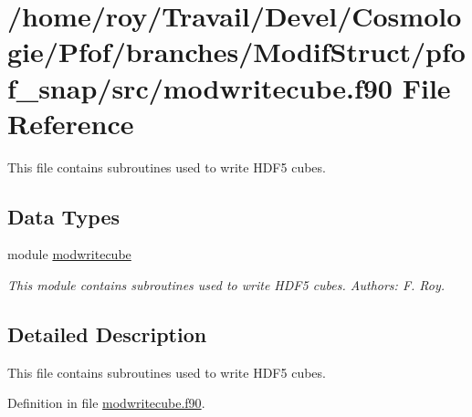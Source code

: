 \hypertarget{modwritecube_8f90}{\section{/home/roy/\-Travail/\-Devel/\-Cosmologie/\-Pfof/branches/\-Modif\-Struct/pfof\-\_\-snap/src/modwritecube.f90 File Reference}
\label{modwritecube_8f90}
}


This file contains subroutines used to write H\-D\-F5 cubes.  


\subsection*{Data Types}
\begin{DoxyCompactItemize}
\item 
module \hyperlink{classmodwritecube}{modwritecube}
\begin{DoxyCompactList}\small\item\em This module contains subroutines used to write H\-D\-F5 cubes. Authors\-: F. Roy. \end{DoxyCompactList}\end{DoxyCompactItemize}


\subsection{Detailed Description}
This file contains subroutines used to write H\-D\-F5 cubes. 

Definition in file \hyperlink{modwritecube_8f90_source}{modwritecube.\-f90}.

